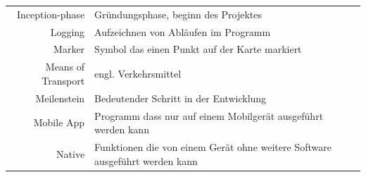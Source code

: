 \documentclass[ngerman,]{article}
\begin{document}
\begin{longtable}[]{@{}rl@{}}
\begin{minipage}[t]{0.18\columnwidth}
Inception-phase\strut
\end{minipage} & \begin{minipage}[t]{0.76\columnwidth}\raggedright\strut
Gründungsphase, beginn des Projektes\strut
\end{minipage}\tabularnewline
\begin{minipage}[t]{0.18\columnwidth}\raggedleft\strut
Logging\strut
\end{minipage} & \begin{minipage}[t]{0.76\columnwidth}\raggedright\strut
Aufzeichnen von Abläufen im Programm\strut
\end{minipage}\tabularnewline
\begin{minipage}[t]{0.18\columnwidth}\raggedleft\strut
Marker\strut
\end{minipage} & \begin{minipage}[t]{0.76\columnwidth}\raggedright\strut
Symbol das einen Punkt auf der Karte markiert\strut
\end{minipage}\tabularnewline
\begin{minipage}[t]{0.18\columnwidth}\raggedleft\strut
Means of Transport\strut
\end{minipage} & \begin{minipage}[t]{0.76\columnwidth}\raggedright\strut
engl. Verkehrsmittel\strut
\end{minipage}\tabularnewline
\begin{minipage}[t]{0.18\columnwidth}\raggedleft\strut
Meilenstein\strut
\end{minipage} & \begin{minipage}[t]{0.76\columnwidth}\raggedright\strut
Bedeutender Schritt in der Entwicklung\strut
\end{minipage}\tabularnewline
\begin{minipage}[t]{0.18\columnwidth}\raggedleft\strut
Mobile App\strut
\end{minipage} & \begin{minipage}[t]{0.76\columnwidth}\raggedright\strut
Programm dass nur auf einem Mobilgerät ausgeführt werden kann\strut
\end{minipage}\tabularnewline
\begin{minipage}[t]{0.18\columnwidth}\raggedleft\strut
Native\strut
\end{minipage} & \begin{minipage}[t]{0.76\columnwidth}\raggedright\strut
Funktionen die von einem Gerät ohne weitere Software ausgeführt werden
kann\strut
\end{minipage}\tabularnewline

\end{longtable}
\end{document}
